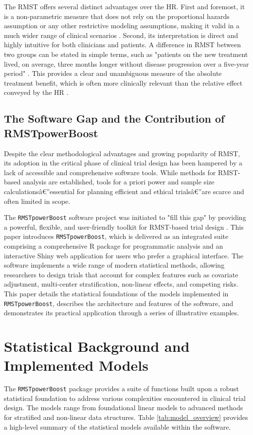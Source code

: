 \documentclass[11pt, a4paper]{article}
\begin{document}
The RMST offers several distinct advantages over the HR. First and foremost, it is a non-parametric measure that does not rely on the proportional hazards assumption or any other restrictive modeling assumptions, making it valid in a much wider range of clinical scenarios \cite{[1]}. Second, its interpretation is direct and highly intuitive for both clinicians and patients. A difference in RMST between two groups can be stated in simple terms, such as "patients on the new treatment lived, on average, three months longer without disease progression over a five-year period" \cite{[1]}. This provides a clear and unambiguous measure of the absolute treatment benefit, which is often more clinically relevant than the relative effect conveyed by the HR \cite{[1]}.

\subsection{The Software Gap and the Contribution of RMSTpowerBoost}
Despite the clear methodological advantages and growing popularity of RMST, its adoption in the critical phase of clinical trial design has been hampered by a lack of accessible and comprehensive software tools. While methods for RMST-based analysis are established, tools for a priori power and sample size calculationsâ€”essential for planning efficient and ethical trialsâ€”are scarce and often limited in scope.

The \texttt{RMSTpowerBoost} software project was initiated to "fill this gap" by providing a powerful, flexible, and user-friendly toolkit for RMST-based trial design \cite{[1]}. This paper introduces \texttt{RMSTpowerBoost}, which is delivered as an integrated suite comprising a comprehensive R package for programmatic analysis and an interactive Shiny web application for users who prefer a graphical interface. The software implements a wide range of modern statistical methods, allowing researchers to design trials that account for complex features such as covariate adjustment, multi-center stratification, non-linear effects, and competing risks. This paper details the statistical foundations of the models implemented in \texttt{RMSTpowerBoost}, describes the architecture and features of the software, and demonstrates its practical application through a series of illustrative examples.

\section{Statistical Background and Implemented Models}
The \texttt{RMSTpowerBoost} package provides a suite of functions built upon a robust statistical foundation to address various complexities encountered in clinical trial design. The models range from foundational linear models to advanced methods for stratified and non-linear data structures. Table \ref{tab:model_overview} provides a high-level summary of the statistical models available within the software.
\end{document}
